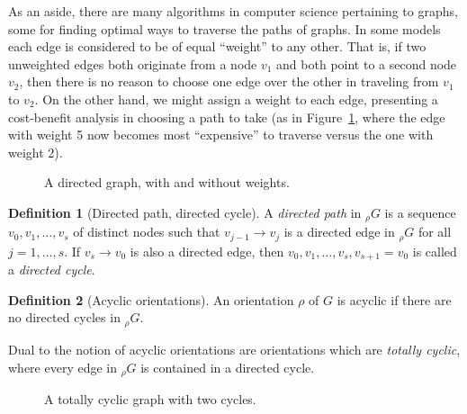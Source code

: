 \documentclass{amsart}
\theoremstyle{plain}
\theoremstyle{remark}
\theoremstyle{definition}
\newtheorem*{definition*}{Definition}
\newenvironment{definition}%
  {\begin{leftbar}\begin{definition*}
}{%
  \end{definition*}\end{leftbar}
}
\begin{document}
As an aside, there are many algorithms in computer science pertaining to graphs,
some for finding optimal ways to traverse the paths of graphs. In some
models each edge is considered to be of equal ``weight'' to any
other. That is, if two unweighted edges both originate from a node $v_1$
and both point to a second node $v_2$, then there is no reason to choose one
edge over the other in traveling from $v_1$ to $v_2$.
On the other hand, we might assign a weight to
each edge, presenting a cost-benefit analysis in choosing a path to take (as in
Figure~\ref{fig:path-finding}, where the edge with weight 5 now becomes most
``expensive'' to traverse versus the one with weight 2).
\begin{figure}[ht]
  \hspace{1in}
  \caption{A directed graph, with and without weights.}\label{fig:path-finding}
\end{figure}

\begin{definition}[Directed path, directed cycle]
  A \emph{directed path} in ${}_\rho G$ is a sequence $v_0,v_1,\ldots,v_s$ of
  distinct nodes such that $v_{j-1}\to v_j$ is a directed edge in ${}_\rho G$
  for all $j=1,\ldots,s$. If $v_s\to v_0$ is also a directed edge, then
  $v_0,v_1,\ldots,v_s,v_{s+1}=v_0$ is called a \emph{directed cycle}.
\end{definition}

\begin{definition}[Acyclic orientations]
  An orientation $\rho$ of $G$ is acyclic if there are no directed cycles in
  ${}_\rho G$.
\end{definition}

Dual to the notion of acyclic orientations are orientations which are
\emph{totally cyclic}, where every edge in ${}_\rho G$ is contained in a
directed cycle.
\begin{figure}[h]
  \caption{A totally cyclic graph with two cycles.}
\end{figure}
\end{document}
